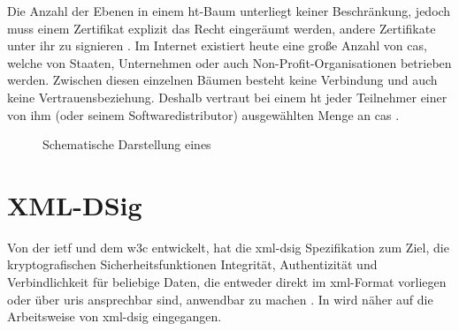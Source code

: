 Die Anzahl der Ebenen in einem \gls{ht}-Baum unterliegt keiner Beschränkung, jedoch muss einem Zertifikat explizit das Recht eingeräumt werden, andere
Zertifikate unter ihr zu signieren \cite{kits}. Im Internet existiert heute eine große Anzahl von \glspl{ca}, welche von Staaten, Unternehmen oder auch
Non-Profit-Organisationen betrieben werden. Zwischen diesen einzelnen Bäumen besteht keine Verbindung und auch keine Vertrauensbeziehung. Deshalb vertraut bei
einem \gls{ht} jeder Teilnehmer einer von ihm (oder seinem Softwaredistributor) ausgewählten Menge an \glspl{ca} \cite{ssliverse:eff,krypto-pki-internet}.

\begin{figure}
\centering

\caption{Schematische Darstellung eines \texorpdfstring{\protect{}}{HT}}
\label{fig:ht}
\end{figure}

\section{XML-DSig}
\label{sec:GrundlagenDefinitionen:xml-dsig}
Von der \gls{ietf} und dem \gls{w3c} entwickelt, hat die \gls{xml-dsig} Spezifikation zum Ziel, die kryptografischen Sicherheitsfunktionen Integrität,
Authentizität und Verbindlichkeit für beliebige Daten, die entweder direkt im \gls{xml}-Format vorliegen oder über \glspl{uri} ansprechbar sind, anwendbar zu
machen \cite{krypto-pki-internet}. In  wird näher auf die Arbeitsweise von \gls{xml-dsig} eingegangen.

